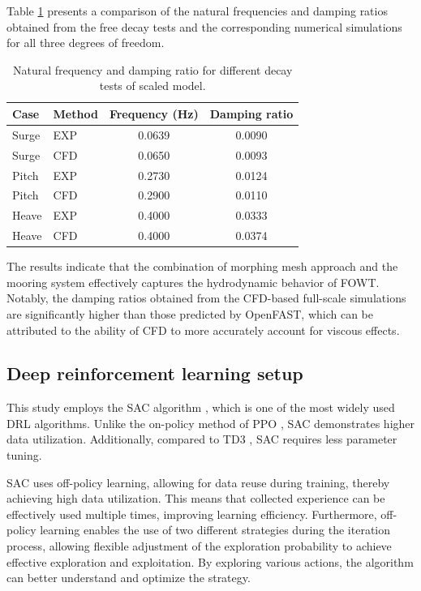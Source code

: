 \documentclass[%
 aip,
 amsmath,amssymb,
 reprint,%
]{revtex4-1}
\begin{document}
Table \ref{tab:decay_results_scaled} presents a comparison of the natural frequencies and damping ratios obtained from the free decay tests and the corresponding numerical simulations for all three degrees of freedom.

\begin{table}[t]
  \centering
  \caption{Natural frequency and damping ratio for different decay tests of scaled model.}
  \label{tab:decay_results_scaled}
  \begin{tabular}{llcc}
    \hline\hline
    \textbf{Case} & \textbf{Method} & \textbf{Frequency (Hz)} & \textbf{Damping ratio} \\ \hline
    Surge & EXP & 0.0639 & 0.0090 \\
    Surge & CFD & 0.0650 & 0.0093 \\
    Pitch & EXP & 0.2730 & 0.0124 \\
    Pitch & CFD & 0.2900 & 0.0110 \\
    Heave & EXP & 0.4000 & 0.0333 \\
    Heave & CFD & 0.4000 & 0.0374 \\
    \hline\hline
  \end{tabular}
\end{table}

The results indicate that the combination of morphing mesh approach and the mooring system effectively captures the hydrodynamic behavior of FOWT. Notably, the damping ratios obtained from the CFD-based full-scale simulations are significantly higher than those predicted by OpenFAST, which can be attributed to the ability of CFD to more accurately account for viscous effects.

\subsection{Deep reinforcement learning setup}

This study employs the SAC algorithm \cite{haarnoja2018soft}, which is one of the most widely used DRL algorithms. Unlike the on-policy method of PPO \cite{schulman2017proximal}, SAC demonstrates higher data utilization. Additionally, compared to TD3 \cite{fujimoto2018addressing}, SAC requires less parameter tuning.

SAC uses off-policy learning, allowing for data reuse during training, thereby achieving high data utilization. This means that collected experience can be effectively used multiple times, improving learning efficiency. Furthermore, off-policy learning enables the use of two different strategies during the iteration process, allowing flexible adjustment of the exploration probability to achieve effective exploration and exploitation. By exploring various actions, the algorithm can better understand and optimize the strategy.
\end{document}
